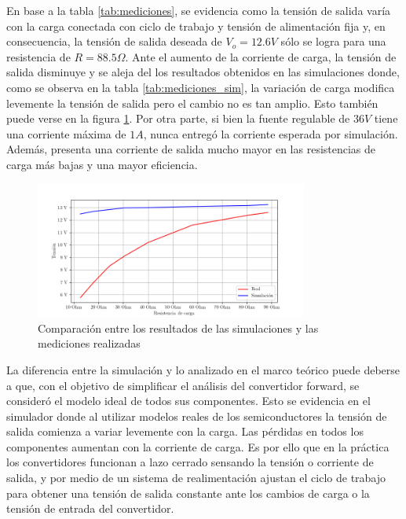 En base a la tabla \ref{tab:mediciones}, se evidencia como la tensión de salida varía con la carga conectada con ciclo de trabajo y tensión de alimentación fija y, en consecuencia, la tensión de salida deseada de $V_{o}=12.6V$ sólo se logra para una resistencia de $R=88.5\Omega$.
Ante el aumento de la corriente de carga, la tensión de salida disminuye y se aleja del los resultados obtenidos en las simulaciones donde, como se observa en la tabla \ref{tab:mediciones_sim}, la variación de carga modifica levemente la tensión de salida pero el cambio no es tan amplio. Esto también puede verse en la figura \ref{fig:comparacion}.
Por otra parte, si bien la fuente regulable de $36V$ tiene una corriente máxima de $1A$, nunca entregó la corriente esperada por simulación. 
Además, presenta una corriente de salida mucho mayor en las resistencias de carga más bajas y una mayor eficiencia. 

\begin{figure}[H]
    \centering
    \includegraphics[width=0.8\textwidth]{images/comparacion-general.png}
    \caption{Comparación entre los resultados de las simulaciones y las mediciones realizadas}
    \label{fig:comparacion}
\end{figure}

La diferencia entre la simulación y lo analizado en el marco teórico puede deberse a que, con el objetivo de simplificar el análisis del convertidor forward, se consideró el modelo ideal de todos sus componentes. 
Esto se evidencia en el simulador donde al utilizar modelos reales de los semiconductores la tensión de salida comienza a variar levemente con la carga. 
Las pérdidas en todos los componentes aumentan con la corriente de carga. 
Es por ello que en la práctica los convertidores funcionan a lazo cerrado sensando la tensión o corriente de salida, y por medio de un sistema de realimentación ajustan el ciclo de trabajo para obtener una tensión de salida constante ante los cambios de carga o la tensión de entrada del convertidor.

